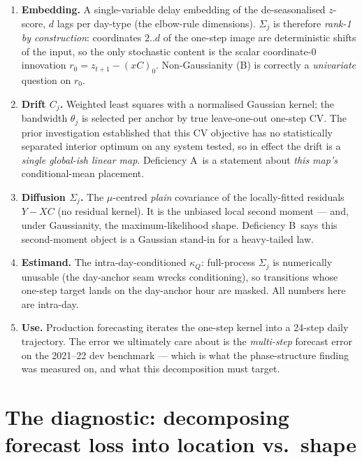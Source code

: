 \documentclass[11pt]{article}
\newcommand{\kQ}{\kappa_{Q}}
\newcommand{\defA}{\textsf{A}}
\newcommand{\defB}{\textsf{B}}
\begin{document}
\begin{enumerate}[leftmargin=2em]
  \item \textbf{Embedding.} A single-variable delay embedding of the
        de-seasonalised $z$-score, $d$ lags per day-type (the elbow-rule
        dimensions). $\Sigma_j$ is therefore \emph{rank-1 by
        construction}: coordinates $2..d$ of the one-step image are
        deterministic shifts of the input, so the only stochastic content
        is the scalar coordinate-0 innovation
        $r_0 = z_{t+1} - (xC)_0$. Non-Gaussianity (\defB) is correctly a
        \emph{univariate} question on $r_0$.
  \item \textbf{Drift $C_j$.} Weighted least squares with a normalised
        Gaussian kernel; the bandwidth $\theta_j$ is selected per anchor
        by true leave-one-out one-step CV. The prior investigation
        established that this CV objective has no statistically
        separated interior optimum on any system tested, so in effect
        the drift is a
        \emph{single global-ish linear map}. Deficiency \defA\ is a
        statement about \emph{this map's} conditional-mean placement.
  \item \textbf{Diffusion $\Sigma_j$.} The $\mu$-centred \emph{plain}
        covariance of the locally-fitted residuals $Y - XC$ (no residual
        kernel). It is the unbiased local second moment --- and, under
        Gaussianity, the maximum-likelihood shape. Deficiency \defB\
        says this second-moment object is a Gaussian stand-in for a
        heavy-tailed law.
  \item \textbf{Estimand.} The intra-day-conditioned $\kQ$: full-process
        $\Sigma_j$ is numerically unusable (the day-anchor seam wrecks
        conditioning), so transitions whose one-step target lands on the
        day-anchor hour are masked. All numbers here are intra-day.
  \item \textbf{Use.} Production forecasting iterates the one-step
        kernel into a 24-step daily trajectory. The error we ultimately
        care about is the \emph{multi-step} forecast error on the
        2021--22 dev benchmark --- which is what the phase-structure
        finding was measured on, and what this decomposition must
        target.
\end{enumerate}

\section{The diagnostic: decomposing forecast loss into location vs.\ shape}
\label{sec:diag}
\end{document}

